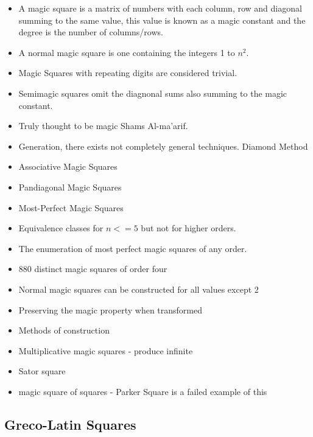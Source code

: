 \documentclass[a4paper,12pt]{article}
\begin{document}
		\begin{itemize}
		\item{A magic square is a matrix of numbers with each column, row and diagonal summing to the same value, 
		this value is known as a magic constant and the degree is the number of columns/rows.}
		\item{A normal magic square is one containing the integers 1 to $n^2$.}
		\item{Magic Squares with repeating digits are considered trivial.}
		\item{Semimagic squares omit the diagnonal sums also summing to the magic constant.}

		\item{Truly thought to be magic Shams Al-ma'arif.}

		\item{Generation, there exists not completely general techniques. Diamond Method}

		\item{Associative Magic Squares}
		\item{Pandiagonal Magic Squares}
		\item{Most-Perfect Magic Squares}
		
		\item{Equivalence classes for $n<=5$ but not for higher orders.}
		\item{The enumeration of most perfect magic squares of any order.}

		\item{880 distinct magic squares of order four}

		\item{Normal magic squares can be constructed for all values except 2}
		\item{Preserving the magic property when transformed}

		\item{Methods of construction}

		\item{Multiplicative magic squares - produce infinite}

		\item{Sator square}

		\item{magic square of squares - Parker Square is a failed example of this}
		\end{itemize}
	
	\subsection{Greco-Latin Squares}
\end{document}
